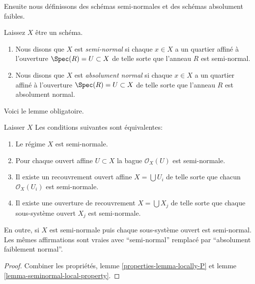 \noindent
Ensuite nous définissons des schémas semi-normales et des schémas absolument faibles.

\begin{definition}

\label{definition-seminormal}
Laissez $X$ être un schéma.
\begin{enumerate}
\item Nous disons que $X$ est {\it semi-normal} si chaque $x \in X$ a un quartier affiné à l'ouverture $\Spec(R) = U \subset X$ de telle sorte que l'anneau $R$ est semi-normal.
\item Nous disons que $X$ est {\it absolument normal} si chaque $x \in X$ a un quartier affiné à l'ouverture $\Spec(R) = U \subset X$ de telle sorte que l'anneau $R$ est absolument normal.
\end{enumerate}

\end{definition}

\noindent
Voici le lemme obligatoire.

\begin{lemma}

\label{lemma-locally-seminormal}

Laisser $X$ Les conditions suivantes sont équivalentes:

\begin{enumerate}

\item Le régime $X$ est semi-normale.
\item Pour chaque ouvert affine $U \subset X$ la bague $\mathcal{O}_X(U)$
est semi-normale.
\item Il existe un recouvrement ouvert affine $X = \bigcup U_i$ de telle sorte que chacun $\mathcal{O}_X(U_i)$ est semi-normale.
\item Il existe une ouverture de recouvrement $X = \bigcup X_j$
de telle sorte que chaque sous-système ouvert $X_j$ est semi-normale.

\end{enumerate}

En outre, si $X$ est semi-normale puis chaque sous-système ouvert est semi-normal. Les mêmes affirmations sont vraies avec ``semi-normal'' remplacé par ``absolument faiblement normal''.

\end{lemma}

\begin{proof}

Combiner les propriétés, lemme \ref{properties-lemma-locally-P} et lemme \ref{lemma-seminormal-local-property}.

\end{proof}

